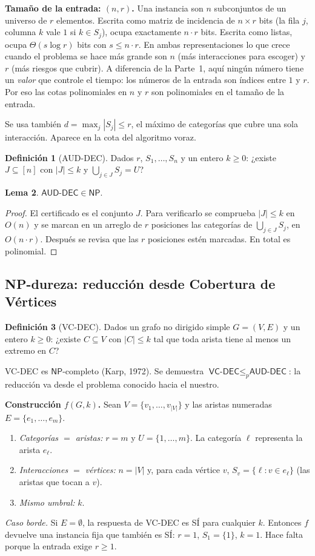 \documentclass[11pt,a4paper]{article}
\theoremstyle{definition}
\newtheorem{definicion}{Definición}[section]
\newtheorem{lema}[definicion]{Lema}
\newcommand{\AUD}{\textsf{AUD-DEC}}
\newcommand{\VC}{\textsf{VC-DEC}}
\newcommand{\NP}{\mathsf{NP}}
\newcommand{\pol}{\le_p}
\begin{document}
\textbf{Tamaño de la entrada: $(n,r)$.} Una instancia son $n$ subconjuntos de un universo de $r$ elementos. Escrita como matriz de incidencia de $n\times r$ bits (la fila $j$, columna $k$ vale $1$ si $k\in S_j$), ocupa exactamente $n\cdot r$ bits. Escrita como listas, ocupa $\Theta(s\log r)$ bits con $s\le n\cdot r$. En ambas representaciones lo que crece cuando el problema se hace más grande son $n$ (más interacciones para escoger) y $r$ (más riesgos que cubrir). A diferencia de la Parte~1, aquí ningún número tiene un \emph{valor} que controle el tiempo: los números de la entrada son índices entre $1$ y $r$. Por eso las cotas polinomiales en $n$ y $r$ son polinomiales en el tamaño de la entrada.

Se usa también $d=\max_j|S_j|\le r$, el máximo de categorías que cubre una sola interacción. Aparece en la cota del algoritmo voraz.

\begin{definicion}[\AUD]
Dados $r$, $S_1,\dots,S_n$ y un entero $k\ge 0$: ¿existe $J\subseteq[n]$ con $|J|\le k$ y $\bigcup_{j\in J}S_j=U$?
\end{definicion}

\begin{lema}
$\AUD\in\NP$.
\end{lema}
\begin{proof}
El certificado es el conjunto $J$. Para verificarlo se comprueba $|J|\le k$ en $O(n)$ y se marcan en un arreglo de $r$ posiciones las categorías de $\bigcup_{j\in J}S_j$, en $O(n\cdot r)$. Después se revisa que las $r$ posiciones estén marcadas. En total es polinomial.
\end{proof}

\subsection{NP-dureza: reducción desde Cobertura de Vértices}

\begin{definicion}[\VC]
Dados un grafo no dirigido simple $G=(V,E)$ y un entero $k\ge 0$: ¿existe $C\subseteq V$ con $|C|\le k$ tal que toda arista tiene al menos un extremo en $C$?
\end{definicion}

\VC{} es $\NP$-completo (Karp, 1972). Se demuestra $\VC\pol\AUD$: la reducción va desde el problema conocido hacia el nuestro.

\textbf{Construcción $f(G,k)$.} Sean $V=\{v_1,\dots,v_{|V|}\}$ y las aristas numeradas $E=\{e_1,\dots,e_m\}$.
\begin{enumerate}[nosep]
  \item \emph{Categorías $=$ aristas:} $r=m$ y $U=\{1,\dots,m\}$. La categoría $\ell$ representa la arista $e_\ell$.
  \item \emph{Interacciones $=$ vértices:} $n=|V|$ y, para cada vértice $v$, $S_v=\{\ell: v\in e_\ell\}$ (las aristas que tocan a $v$).
  \item \emph{Mismo umbral:} $k$.
\end{enumerate}
\emph{Caso borde.} Si $E=\emptyset$, la respuesta de \VC{} es SÍ para cualquier $k$. Entonces $f$ devuelve una instancia fija que también es SÍ: $r=1$, $S_1=\{1\}$, $k=1$. Hace falta porque la entrada exige $r\ge 1$.
\end{document}
